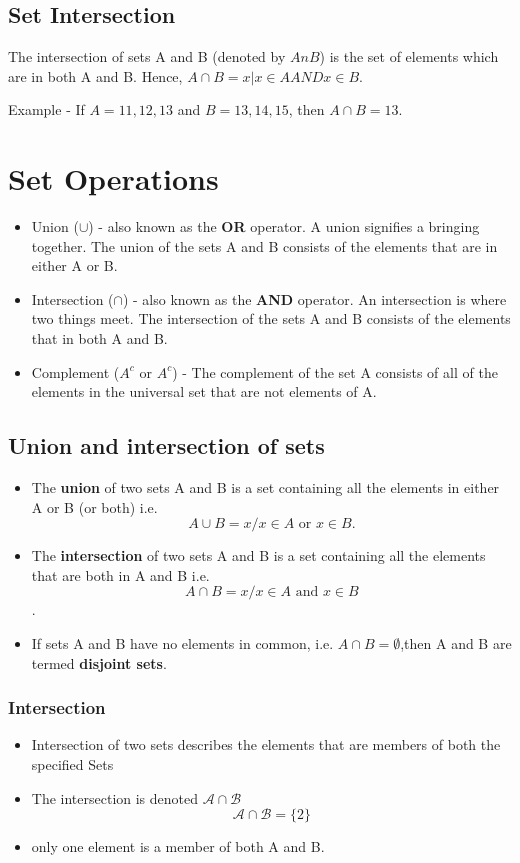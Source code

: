 \documentclass[12pt]{article}
\begin{document}
\subsection{Set Intersection}
The intersection of sets A and B (denoted by $AnB$) is the set of elements which are in both A and B. Hence, $A \cap B={x|x \in A AND x \in B}$.

Example - If $A={11,12,13}$ and $B={13,14,15}$, then $A \cap B={13}$.


\newpage
\section*{Set Operations}
\begin{itemize}
	\item Union ($\cup$) - also known as the \textbf{OR} operator. A union signifies a bringing together. The union of the sets A and B consists of the elements that are in either A or B.
	\item Intersection ($\cap$) - also known as the \textbf{AND} operator. An intersection is where two things meet. The intersection of the sets A and B consists of the elements that in both A and B.
	\item Complement ($A^{c}$ or $A^{c}$) - The complement of the set A consists of all of the elements in the universal set that are not elements of A.
\end{itemize}

\newpage
\subsection*{Union and intersection of sets}
\begin{itemize}
\item The \textbf{union} of two sets A and B is a set containing all the elements in
either A or B (or both)
i.e.
\[A \cup B = {x / x \in A \mbox{ or } x \in B}.\]
\item The \textbf{intersection} of two sets A and B is a set containing all the elements
that are both in A and B
i.e.
\[A \cap B = {x / x \in A \mbox{ and }x \in B}\].
\item If sets A and B have no elements in common, i.e. $A \cap B = \emptyset$,then A and B
are termed \textbf{disjoint sets}.
\end{itemize}
\newpage
\subsubsection*{Intersection}
\begin{itemize}
\item Intersection of two sets describes the elements that are members of both the specified Sets
\item The intersection is denoted $\mathcal{A\cap B}$
\[ \mathcal{A\cap B} = \{2\}\]
\item only one element is a member of both A and B.
\end{itemize}
\end{document}
